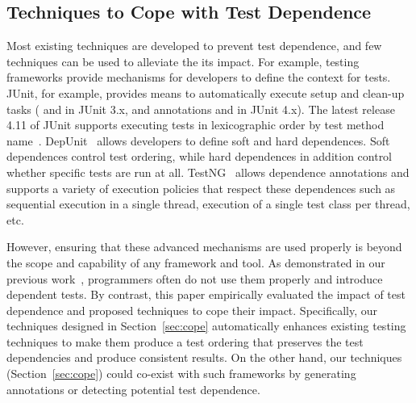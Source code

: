 \subsection{Techniques to Cope with Test Dependence}

Most existing techniques are developed to prevent
test dependence, and few techniques can be used to alleviate
the its impact.
For example, testing frameworks provide mechanisms
for developers to define the context for tests.
JUnit, for example, provides means to
automatically execute setup and clean-up tasks
( and  in JUnit
3.x, and annotations  and  in
JUnit 4.x). The latest release 4.11 of JUnit supports
executing tests in lexicographic order by test method name~\cite{junitordering}.
DepUnit~\cite{depunit} allows developers to define soft and hard dependences. Soft dependences control
test ordering, while hard dependences in addition control whether specific tests are
run at all.  TestNG~\cite{testng} 
allows dependence annotations and supports a variety of execution policies
that respect these dependences
such as sequential execution
in a single thread, execution of a single test class per thread, etc.\

However, ensuring that these advanced mechanisms are used properly is
beyond the scope and capability of any framework and tool. As
demonstrated in our previous work~\cite{testdependence},
programmers often do not use them properly and introduce
dependent tests. By contrast, this paper empirically
evaluated the impact of test dependence and proposed
techniques to cope their impact. Specifically,
our techniques designed in Section~\ref{sec:cope} automatically
enhances existing testing techniques to make them
produce a test ordering that preserves the test dependencies
and produce consistent results.
%
On the other hand, our techniques (Section~\ref{sec:cope}) could co-exist
with such frameworks by generating annotations or detecting potential
test dependence.



